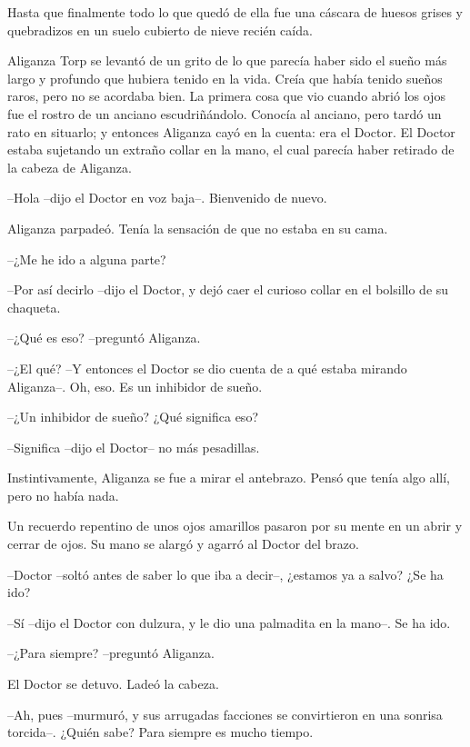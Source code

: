 Hasta que finalmente todo lo que quedó de ella fue una cáscara de huesos grises y quebradizos en un suelo cubierto de nieve recién caída.



Aliganza Torp se levantó de un grito de lo que parecía haber sido el sueño más largo y profundo que hubiera tenido en la vida. Creía que había tenido sueños raros, pero no se acordaba bien. La primera cosa que vio cuando abrió los ojos fue el rostro de un anciano escudriñándolo. Conocía al anciano, pero tardó un rato en situarlo; y entonces Aliganza cayó en la cuenta: era el Doctor. El Doctor estaba sujetando un extraño collar en la mano, el cual parecía haber retirado de la cabeza de Aliganza.

--Hola --dijo el Doctor en voz baja--. Bienvenido de nuevo.

Aliganza parpadeó. Tenía la sensación de que no estaba en su cama.

--¿Me he ido a alguna parte?

--Por así decirlo --dijo el Doctor, y dejó caer el curioso collar en el bolsillo de su chaqueta.

--¿Qué es eso? --preguntó Aliganza.

--¿El qué? --Y entonces el Doctor se dio cuenta de a qué estaba mirando Aliganza--. Oh, eso. Es un inhibidor de sueño.

--¿Un inhibidor de sueño? ¿Qué significa eso?

--Significa --dijo el Doctor-- no más pesadillas.

Instintivamente, Aliganza se fue a mirar el antebrazo. Pensó que tenía algo allí, pero no había nada.

Un recuerdo repentino de unos ojos amarillos pasaron por su mente en un abrir y cerrar de ojos. Su mano se alargó y agarró al Doctor del brazo.

--Doctor --soltó antes de saber lo que iba a decir--, ¿estamos ya a salvo? ¿Se ha ido?

--Sí --dijo el Doctor con dulzura, y le dio una palmadita en la mano--. Se ha ido.

--¿Para siempre? --preguntó Aliganza.

El Doctor se detuvo. Ladeó la cabeza.

--Ah, pues --murmuró, y sus arrugadas facciones se convirtieron en una sonrisa torcida--. ¿Quién sabe? Para siempre es mucho tiempo.

